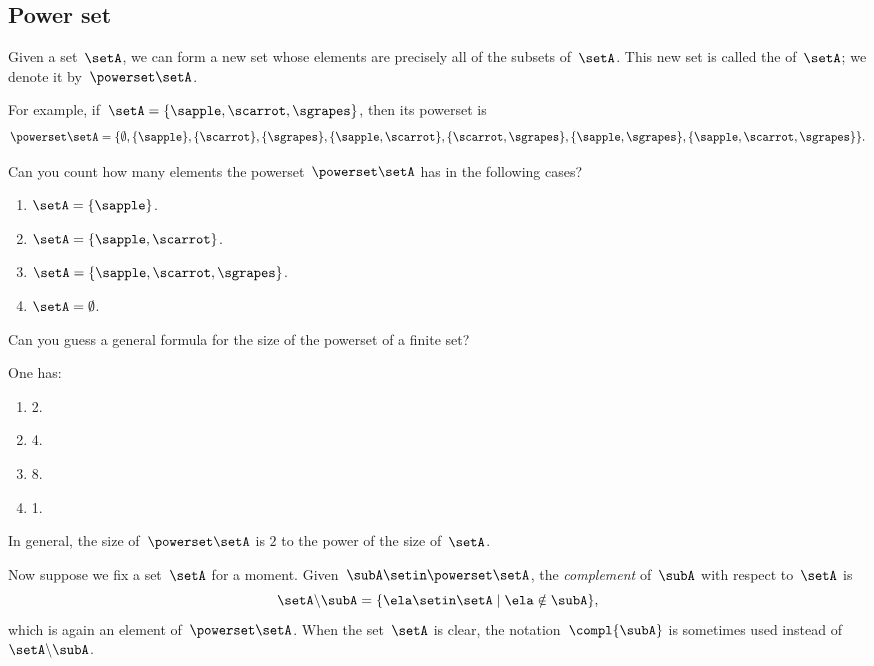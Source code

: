 \subsection{Power set}
\label{sec:power-set}

Given a set~$\setA$, we can form a new set whose elements are precisely all of the subsets of~$\setA$.
This new set is called the  of~$\setA$; we denote it by~$\powerset \setA$.

For example, if~$\setA = \{ \sapple, \scarrot, \sgrapes \}$, then its powerset is
\begin{equation*}
    \powerset \setA = \{ \emptyset, \{ \sapple \}, \{ \scarrot \}, \{ \sgrapes\}, \{ \sapple, \scarrot \}, \{ \scarrot, \sgrapes \}, \{ \sapple, \sgrapes\}, \{ \sapple, \scarrot, \sgrapes \} \}.
\end{equation*}

\begin{exercise}
    Can you count how many elements the powerset~$\powerset \setA$ has in the following cases?
    \begin{enumerate}
        \item $\setA = \{ \sapple \} $.
        \item $\setA = \{ \sapple, \scarrot \} $.
        \item $\setA = \{ \sapple, \scarrot, \sgrapes \} $.
        \item $\setA = \emptyset $.
    \end{enumerate}
    Can you guess a general formula for the size of the powerset of a finite set?
\end{exercise}

\begin{solution}
    One has:
    \begin{enumerate}
        \item 2.
        \item 4.
        \item 8.
        \item 1.
    \end{enumerate}
    In general, the size of~$\powerset \setA$ is $2$ to the power of the size of~$\setA$.
\end{solution}

Now suppose we fix a set~$\setA$ for a moment.
Given~$\subA \setin\powerset \setA$, the \emph{complement} of~$\subA$ with respect to~$\setA$ is
\begin{equation*}
    \setA \backslash \subA = \{ \ela \setin\setA \mid \ela \notin \subA \},
\end{equation*}
which is again an element of~$\powerset \setA$.
When the set~$\setA$ is clear, the notation~$\compl{\subA}$ is sometimes used instead of~$\setA \backslash \subA$.

